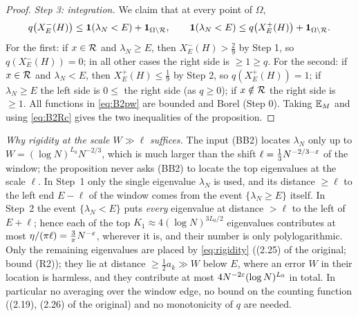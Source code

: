 \begin{proof}
\emph{Step 3: integration.} We claim that at every point of $\Omega$,
\begin{equation}\label{eq:B2pw}
q\big(X^-_E(H)\big)\le\mathbf 1(\lambda_N<E)+\mathbf 1_{\Omega\setminus\mathcal{R}},\qquad
\mathbf 1(\lambda_N<E)\le q\big(X^+_E(H)\big)+\mathbf 1_{\Omega\setminus\mathcal{R}}.
\end{equation}
For the first: if $x\in\mathcal{R}$ and $\lambda_N\ge E$, then $X^-_E(H)>\frac29$ by Step 1, so $q(X^-_E(H))=0$; in all other cases the right side is $\ge1\ge q$.
For the second: if $x\in\mathcal{R}$ and $\lambda_N<E$, then $X^+_E(H)\le\frac19$ by Step 2, so $q(X^+_E(H))=1$; if $\lambda_N\ge E$ the left side is $0\le$ the right side
(as $q\ge0$); if $x\notin\mathcal{R}$ the right side is $\ge1$. All functions in \eqref{eq:B2pw} are bounded and Borel (Step 0). Taking $\mathbb{E}_M$ and using \eqref{eq:B2Rc}
gives the two inequalities of the proposition.
\end{proof}

\noindent\emph{Why rigidity at the scale $W\gg\ell$ suffices.} The input (BB2) locates $\lambda_N$ only up to $W=(\log N)^{L_0}N^{-2/3}$, which is much larger than
the shift $\ell=\frac13N^{-2/3-\varepsilon}$ of the window; the proposition never asks (BB2) to locate the top eigenvalues at the scale $\ell$. In Step~1 only the single
eigenvalue $\lambda_N$ is used, and its distance $\ge\ell$ to the left end $E-\ell$ of the window comes from the event $\{\lambda_N\ge E\}$ itself. In Step~2 the event
$\{\lambda_N<E\}$ puts \emph{every} eigenvalue at distance $>\ell$ to the left of $E+\ell$; hence each of the top $K_1\approx4(\log N)^{3L_0/2}$ eigenvalues contributes at most
$\eta/(\pi\ell)=\frac3\pi N^{-\varepsilon}$, wherever it is, and their number is only polylogarithmic. Only the remaining eigenvalues are placed by \eqref{eq:rigidity} ((2.25) of the original; bound (R2)); they lie
at distance $\ge\frac12a_k\gg W$ below $E$, where an error $W$ in their location is harmless, and they contribute at most $4N^{-2\varepsilon}(\log N)^{L_0}$ in total.
In particular no averaging over the window edge, no bound on the counting function ((2.19), (2.26) of the original) and no monotonicity of $q$ are needed.
